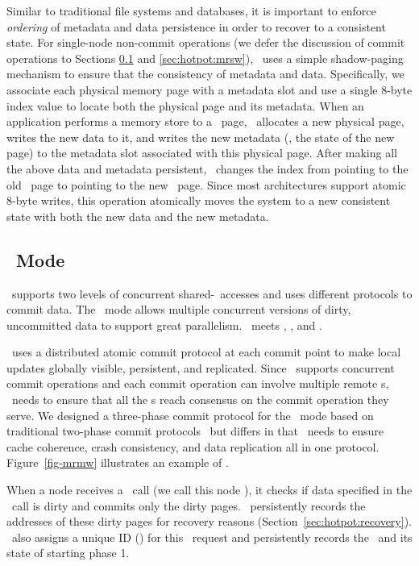 Similar to traditional file systems and databases, 
it is important to enforce {\em ordering} of metadata and data persistence
in order to recover to a consistent state.
For single-node non-commit operations (we defer the discussion of commit operations to Sections \ref{sec:hotpot:mrmw} and \ref{sec:hotpot:mrsw}), 
\hotpot\ uses a simple shadow-paging mechanism to ensure that the consistency of metadata and data.
Specifically, we associate each physical memory page with a metadata slot
and use a single 8-byte index value to locate both the physical page and its metadata.
When an application performs a memory store to a \committed\ page,
\hotpot\ allocates a new physical page, writes the new data to it, and writes the new metadata 
(\eg, the state of the new page) to the metadata slot associated with this physical page.
After making all the above data and metadata persistent, \hotpot\ changes the index
from pointing to the old \committed\ page to pointing to the new \dirty\ page.
Since most architectures support atomic 8-byte writes, this operation atomically moves the system to a new consistent state with both the new data and the new metadata.

\subsection{\mrmw\ Mode}
\label{sec:hotpot:mrmw}
\hotpot\ supports two levels of concurrent shared-\nvm\ accesses and uses different protocols to commit data.
The \mrmw\ mode allows multiple concurrent versions of dirty, uncommitted data 
to support great parallelism.
\mrmw\ meets \rb, \rcm, and \re.

\mrmw\ uses a distributed atomic commit protocol at each commit point %
to make local updates globally visible, persistent, and replicated.
Since \mrmw\ supports concurrent commit operations 
and each commit operation can involve multiple remote \on{}s,
\hotpot\ needs to ensure that all the \on{}s reach consensus on the commit operation they serve. 
We designed a three-phase commit protocol for the \mrmw\ mode
based on traditional two-phase commit protocols~\cite{Samaras93,Gray78,Lampson81} but differs in that
\hotpot\ needs to ensure cache coherence, crash consistency, and data replication all in one protocol.
Figure~\ref{fig-mrmw} illustrates an example of \mrmw. 



When a node receives a \commitxact\ call (we call this node {\em \xn}), it checks if data specified in the \commitxact\ call is dirty
and commits only the dirty pages.
\xn\ persistently records the addresses of these dirty pages for recovery reasons (Section~\ref{sec:hotpot:recovery}).
\xn\ also assigns a unique ID ({\em \xactid}) for this \commitxact\ request and persistently records the \xactid\ and its state of starting phase 1. 
 
